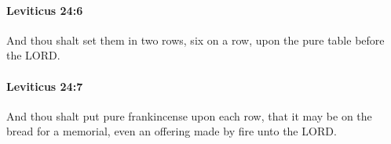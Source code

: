 		\paragraph{Leviticus 24:6} %
			\label{LEVITICUS-24-6}

			And thou shalt set them in two rows, six on a row, upon the pure table before the LORD.


		\paragraph{Leviticus 24:7} %
			\label{LEVITICUS-24-7}

			And thou shalt put pure frankincense upon each row, that it may be on the bread for a memorial, even an offering made by fire unto the LORD.


